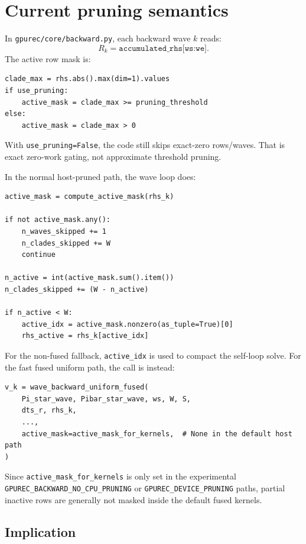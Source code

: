 \documentclass[11pt]{article}
\newcommand{\code}[1]{\texttt{#1}}
\begin{document}
\section{Current pruning semantics}

In \code{gpurec/core/backward.py}, each backward wave \(k\) reads:
\[
  R_k = \code{accumulated\_rhs[ws:we]}.
\]
The active row mask is:

\begin{lstlisting}
clade_max = rhs.abs().max(dim=1).values
if use_pruning:
    active_mask = clade_max >= pruning_threshold
else:
    active_mask = clade_max > 0
\end{lstlisting}

With \code{use\_pruning=False}, the code still skips exact-zero rows/waves.
That is exact zero-work gating, not approximate threshold pruning.

In the normal host-pruned path, the wave loop does:

\begin{lstlisting}
active_mask = compute_active_mask(rhs_k)

if not active_mask.any():
    n_waves_skipped += 1
    n_clades_skipped += W
    continue

n_active = int(active_mask.sum().item())
n_clades_skipped += (W - n_active)

if n_active < W:
    active_idx = active_mask.nonzero(as_tuple=True)[0]
    rhs_active = rhs_k[active_idx]
\end{lstlisting}

For the non-fused fallback, \code{active\_idx} is used to compact the self-loop
solve.  For the fast fused uniform path, the call is instead:

\begin{lstlisting}
v_k = wave_backward_uniform_fused(
    Pi_star_wave, Pibar_star_wave, ws, W, S,
    dts_r, rhs_k,
    ...,
    active_mask=active_mask_for_kernels,  # None in the default host path
)
\end{lstlisting}

Since \code{active\_mask\_for\_kernels} is only set in the experimental
\code{GPUREC\_BACKWARD\_NO\_CPU\_PRUNING} or
\code{GPUREC\_DEVICE\_PRUNING} paths, partial inactive rows are generally not
masked inside the default fused kernels.

\subsection{Implication}
\end{document}

